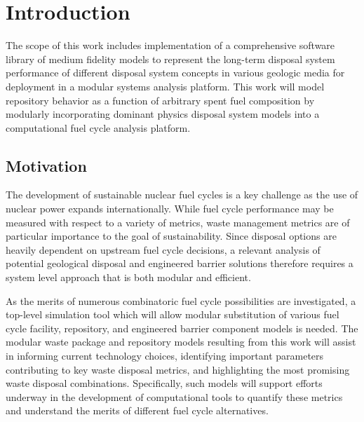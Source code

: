 \chapter{Introduction}\label{ch:introduction}

The scope of this work includes implementation of a comprehensive 
software library of medium fidelity models to represent the long-term 
disposal system performance of different disposal system concepts in 
various geologic media for deployment in a modular systems analysis 
platform.  This work will model repository behavior as a function of 
arbitrary spent fuel composition by modularly incorporating dominant 
physics disposal system models into a computational fuel cycle 
analysis platform.

\section{Motivation} 

The development of sustainable nuclear fuel cycles is a key challenge 
as the use of nuclear power expands internationally. While fuel cycle 
performance may be measured with respect to a variety of metrics, 
waste management metrics are of particular importance to the goal of 
sustainability. Since disposal options are heavily dependent on 
upstream fuel cycle decisions, a relevant analysis of potential 
geological disposal and engineered barrier solutions therefore 
requires a system level approach that is both modular and efficient. 

As the merits of numerous combinatoric fuel cycle possibilities are 
investigated, a top-level simulation tool which will allow modular 
substitution of various fuel cycle facility, repository, and 
engineered barrier component models is needed. The modular waste 
package and repository models resulting from this work will assist in 
informing current technology choices, identifying important parameters 
contributing to key waste disposal metrics, and highlighting the most 
promising waste disposal combinations. Specifically, such models will 
support efforts underway in the development of computational tools to 
quantify these metrics and understand the merits of different fuel 
cycle alternatives. 

